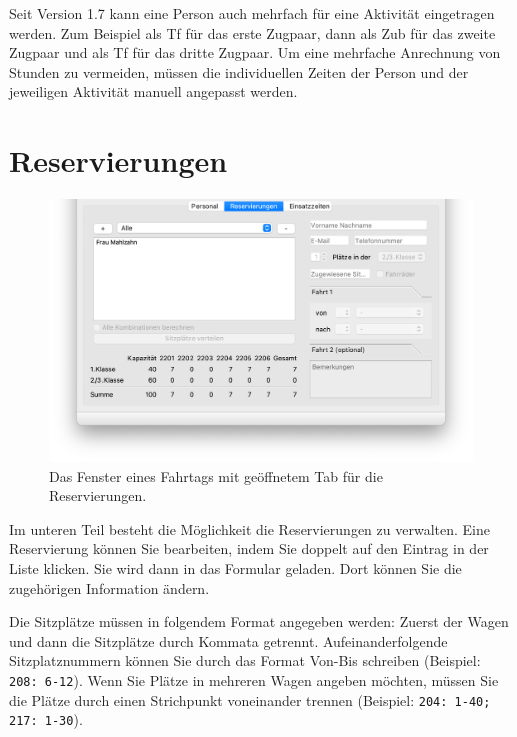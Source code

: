 \begin{hinweis}
  Seit Version 1.7 kann eine Person auch mehrfach für eine Aktivität eingetragen werden.
  Zum Beispiel als Tf für das erste Zugpaar,
  dann als Zub für das zweite Zugpaar und als Tf für das dritte Zugpaar.
  Um eine mehrfache Anrechnung von Stunden zu vermeiden,
  müssen die individuellen Zeiten der Person und der jeweiligen Aktivität manuell angepasst werden.
\end{hinweis}



\section{Reservierungen}
\begin{figure}[!h]
	\includegraphics[width=\textwidth]{img/fahrtag_reservierungen}
	\caption{Das Fenster eines Fahrtags mit geöffnetem Tab für die Reservierungen.}
	\label{fig:einsatz:fahrtag:reservierungen}
\end{figure}
Im unteren Teil besteht die Möglichkeit die Reservierungen zu verwalten.
Eine Reservierung können Sie bearbeiten, indem Sie doppelt auf den Eintrag in der Liste klicken.
Sie wird dann in das Formular geladen. Dort können Sie die zugehörigen Information ändern.


Die Sitzplätze müssen in folgendem Format angegeben werden:
Zuerst der Wagen und dann die Sitzplätze durch Kommata getrennt.
Aufeinanderfolgende Sitzplatznummern können Sie durch das Format Von-Bis schreiben (Beispiel: \texttt{208: 6-12}).
Wenn Sie Plätze in mehreren Wagen angeben möchten,
müssen Sie die Plätze durch einen Strichpunkt voneinander trennen
(Beispiel: \texttt{204: 1-40; 217: 1-30}).


